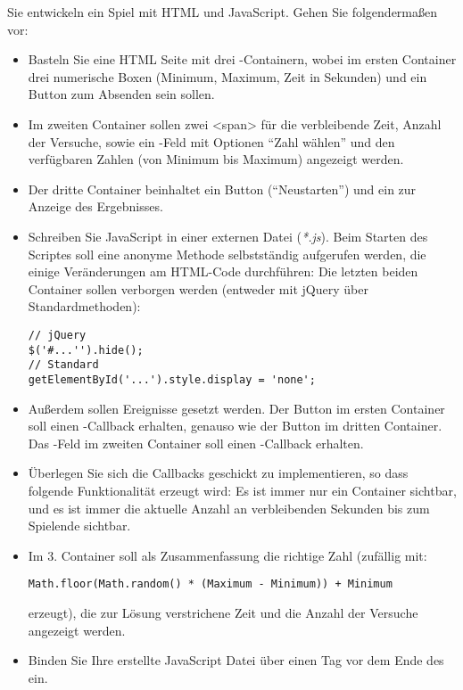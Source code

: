 %
\par Sie entwickeln ein Spiel mit HTML und JavaScript. Gehen Sie folgendermaßen
vor:
%
\begin{itemize}
\item
Basteln Sie eine HTML Seite mit drei -Containern, wobei im ersten
Container drei numerische Boxen (Minimum, Maximum, Zeit in Sekunden) und ein
Button zum Absenden sein sollen.
\item
Im zweiten Container sollen zwei <span> für die verbleibende Zeit, Anzahl der
Versuche, sowie ein -Feld mit Optionen ``Zahl wählen'' und den
verfügbaren Zahlen (von Minimum bis Maximum) angezeigt werden.
\item
Der dritte Container beinhaltet ein Button (``Neustarten'') und ein 
zur Anzeige des Ergebnisses.
\item
Schreiben Sie JavaScript in einer externen Datei (\emph{*.js}). Beim Starten
des Scriptes soll eine anonyme Methode selbstständig aufgerufen werden, die
einige Veränderungen am HTML-Code durchführen: Die letzten beiden Container
sollen verborgen werden (entweder mit jQuery über Standardmethoden):
%
\begin{lstlisting}
// jQuery
$('#...'').hide();
// Standard
getElementById('...').style.display = 'none';
\end{lstlisting}
%
\item
Außerdem sollen Ereignisse gesetzt werden. Der Button im ersten Container soll
einen -Callback erhalten, genauso wie der Button im dritten
Container. Das -Feld im zweiten Container soll einen
-Callback erhalten.
\item
Überlegen Sie sich die Callbacks geschickt zu implementieren, so dass folgende
Funktionalität erzeugt wird: Es ist immer nur ein Container sichtbar, und es
ist immer die aktuelle Anzahl an verbleibenden Sekunden bis zum Spielende
sichtbar.
\item
Im 3. Container soll als Zusammenfassung die richtige Zahl (zufällig mit:
%
\begin{lstlisting}
Math.floor(Math.random() * (Maximum - Minimum)) + Minimum
\end{lstlisting}
%
erzeugt), die zur Lösung verstrichene Zeit und die Anzahl der Versuche
angezeigt werden.
\item
Binden Sie Ihre erstellte JavaScript Datei über einen  Tag vor dem
Ende des  ein.
\end{itemize}